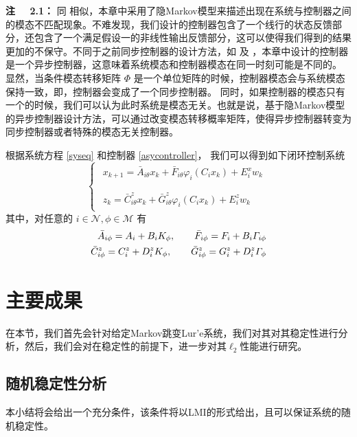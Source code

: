 	{\bf 注 \ \ 2.1：} 
	同 \cite{wu2016passivity} 相似，本章中采用了隐Markov模型来描述出现在系统与控制器之间的模态不匹配现象。不难发现，我们设计的控制器包含了一个线行的状态反馈部分，还包含了一个满足假设一的非线性输出反馈部分，这可以使得我们得到的结果更加的不保守。不同于之前同步控制器的设计方法，如\cite{song_control} 及 \cite{costaolv_control_1}，本章中设计的控制器是一个异步控制器，这意味着系统模态和控制器模态在同一时刻可能是不同的。 显然，当条件模态转移矩阵 $\varPhi$ 是一个单位矩阵的时候，控制器模态会与系统模态保持一致，即，控制器会变成了一个同步控制器。 同时，如果控制器的模态只有一个的时候，我们可以认为此时系统是模态无关。也就是说，基于隐Markov模型的异步控制器设计方法，可以通过改变模态转移概率矩阵，使得异步控制器转变为同步控制器或者特殊的模态无关控制器。
	
	根据系统方程 \eqref{syseq} 和控制器 \eqref{asycontroller}， 我们可以得到如下闭环控制系统
	\begin{equation}\label{close_system_equation_2}
	\left\{
	\begin{array}{lr}
	\begin{split}
	x_{k+1}=\bar{A}_{i\theta}x_k+\bar{F}_{i\theta}\varphi_{i}(C_ix_k)+E_i^xw_k\\
	\end{split}
	\\
	\begin{split}
	z_k=\bar{C}^{z}_{i\theta}x_k+\bar{G}^{z}_{i\theta}\varphi_{i}(C_ix_k)+E^z_iw_k
	\end{split}
	\end{array}
	\right.
	\end{equation} 
	其中，对任意的 $i \in \mathcal{N}, \phi \in \mathcal{M}$ 有
	\begin{equation} \notag
	\begin{aligned}
	\bar{A}_{i\phi}=A_{i}+B_{i}K_{\phi},  \qquad \bar{F}_{i\phi}=F_{i}+B_{i}\varGamma_{i\phi} \\
	\bar{C}^{z}_{i\phi}=C^{z}_{i}+D^{z}_{i}K_{\phi}, \qquad \bar{G}^{z}_{i\phi}=G^{z}_{i}+D^{z}_{i}\varGamma_{\phi}
	\end{aligned}
	\end{equation}
	

\section{主要成果}
	在本节，我们首先会针对给定Markov跳变Lur'e系统，我们对其对其稳定性进行分析，然后，我们会对在稳定性的前提下，进一步对其$\ell_2$性能进行研究。

\subsection{随机稳定性分析}
	本小结将会给出一个充分条件，该条件将以LMI的形式给出，且可以保证系统的随机稳定性。
	
